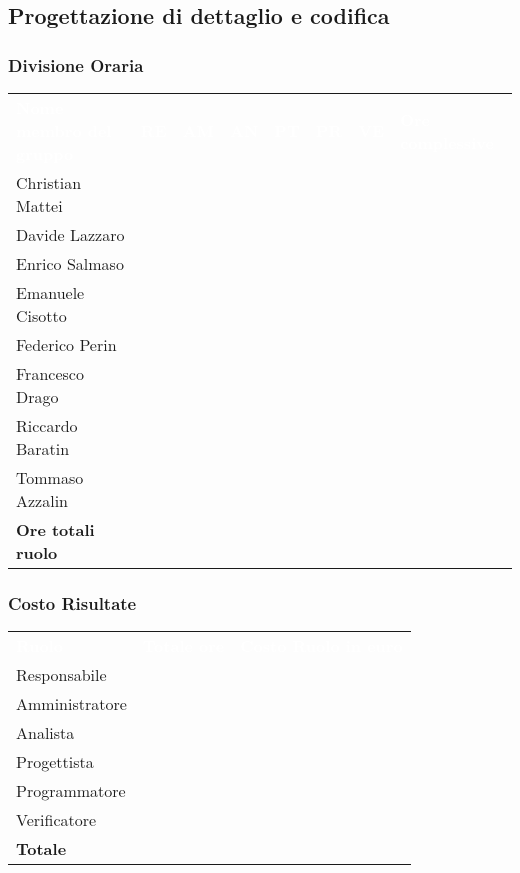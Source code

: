 \subsection{Progettazione di dettaglio e codifica}

\subsubsection{Divisione Oraria}
{
	\renewcommand{\arraystretch}{2}
	\centering
	\begin{longtable}{ C{5cm} C{1cm} C{1cm} C{1cm} C{1cm} C{1cm} C{1cm} C{3cm}}
		\textcolor{white}{\textbf{Nome membro del gruppo}} & \textcolor{white}{\textbf{RE}} & \textcolor{white}{\textbf{AM}} & \textcolor{white}{\textbf{AN}} & \textcolor{white}{\textbf{PT}} & \textcolor{white}{\textbf{PR}} & \textcolor{white}{\textbf{VE}} & \textcolor{white}{\textbf{Ore complessive}}\\	
        
        Christian Mattei & & & & & & & \\
        Davide Lazzaro & & & & & & & \\
        Enrico Salmaso & & & & & & & \\
        Emanuele Cisotto & & & & & & & \\
        Federico Perin & & & & & & & \\
        Francesco Drago & & & & & & & \\
        Riccardo Baratin & & & & & & & \\
        Tommaso Azzalin & & & & & & & \\
        \textbf{Ore totali ruolo} & & & & & & & \\
		
	\end{longtable}
}

\subsubsection{Costo Risultate}
{
	\renewcommand{\arraystretch}{2}
	\centering
	\begin{longtable}{ C{3cm} C{2cm} C{4cm}}
		\textcolor{white}{\textbf{Ruolo}} & \textcolor{white}{\textbf{Totale ore}} & \textcolor{white}{\textbf{Costo Ruolo in euro}}\\	
        
        Responsabile & & \\
        Amministratore & & \\
        Analista & & \\
        Progettista & & \\
        Programmatore & & \\
        Verificatore & & \\
        \textbf{Totale} & & \\
		
	\end{longtable}
}


